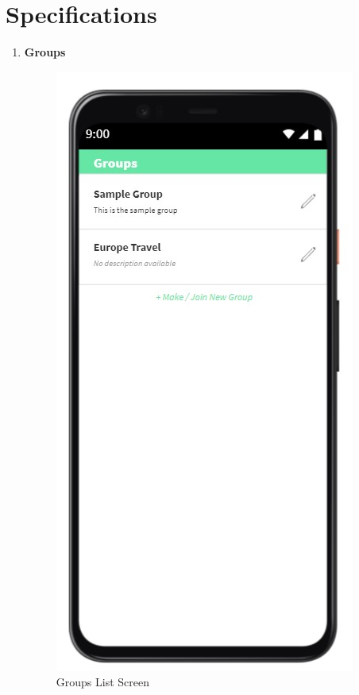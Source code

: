 \documentclass[conference]{IEEEtran}
\begin{document}
\section{Specifications}
    \begin{enumerate}
        \item \textbf{Groups}
            \begin{figure}[H]
                \centerline{\includegraphics[scale=0.5]{img/ui/group-main.jpg}}
                \caption{Groups List Screen}
                \label{fig:groups-list-screen}
            \end{figure}
            \begin{figure}[H]

\end{figure}
\end{enumerate}
\end{document}

